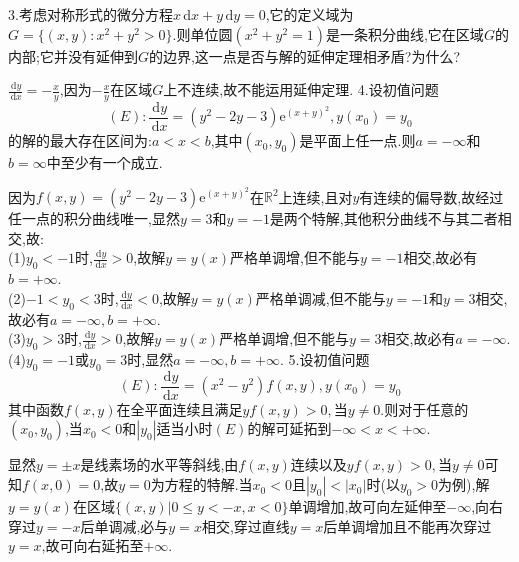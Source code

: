 \documentclass[titlepage,11pt,a4paper,twoside]{report}
\makeatletter
\newcommand\diff{\,\mathrm{d}}
\newcommand\e{\mathrm{e}}
\renewenvironment{proof}{\par
	\pushQED{\qed}%
	\normalfont \topsep1\p@\@plus6\p@\relax
	\trivlist
	\item\relax
	{\hspace*{\parindent}{\heiti 证明}\@addpunct{:}}\hspace\labelsep\ignorespaces
}{%
	\popQED\endtrivlist\@endpefalse
}
\newenvironment{solve}{\par
	\pushQED{\qed}%
	\normalfont \topsep1\p@\@plus6\p@\relax
	\trivlist
	\item\relax
	{\hspace*{\parindent}{\heiti 解}\@addpunct{:}}\hspace\labelsep\ignorespaces
}{%
	\popQED\endtrivlist\@endpefalse
}
\makeatother
\begin{document}
3.考虑对称形式的微分方程$x\diff x+y\diff y=0$,它的定义域为$G=\{(x,y):x^2+y^2>0\}$.则单位圆$(x^2+y^2=1)$是一条积分曲线,它在区域$G$的内部;它并没有延伸到$G$的边界,这一点是否与解的延伸定理相矛盾?为什么?
\begin{solve}
$\frac{\diff y}{\diff x}=-\frac{x}{y}$,因为$-\frac{x}{y}$在区域$G$上不连续,故不能运用延伸定理.
\end{solve}
4.设初值问题
\[(E):\frac{\diff y}{\diff x}=(y^2-2y-3)\e^{(x+y)^2},y(x_0)=y_0\]
的解的最大存在区间为:$a<x<b$,其中$(x_0,y_0)$是平面上任一点.则$a=-\infty$和$b=\infty$中至少有一个成立.
\begin{proof}
因为$f(x,y)=(y^2-2y-3)\e^{(x+y)^2}$在$\mathbb{R}^2$上连续,且对$y$有连续的偏导数,故经过任一点的积分曲线唯一,显然$y=3$和$y=-1$是两个特解,其他积分曲线不与其二者相交,故:\\
(1)$y_0<-1$时,$\frac{\diff y}{\diff x}>0$,故解$y=y(x)$严格单调增,但不能与$y=-1$相交,故必有$b=+\infty$.\\
(2)$-1<y_0<3$时,$\frac{\diff y}{\diff x}<0$,故解$y=y(x)$严格单调减,但不能与$y=-1$和$y=3$相交,故必有$a=-\infty,b=+\infty$.\\
(3)$y_0>3$时,$\frac{\diff y}{\diff x}>0$,故解$y=y(x)$严格单调增,但不能与$y=3$相交,故必有$a=-\infty$.\\
(4)$y_0=-1$或$y_0=3$时,显然$a=-\infty,b=+\infty$.
\end{proof}
5.设初值问题
\[(E):\frac{\diff y}{\diff x}=(x^2-y^2)f(x,y),y(x_0)=y_0\]
其中函数$f(x,y)$在全平面连续且满足$yf(x,y)>0,\mbox{当}y\neq0$.则对于任意的$(x_0,y_0)$,当$x_0<0$和$|y_0|$适当小时$(E)$的解可延拓到$-\infty<x<+\infty$.
\begin{proof}
显然$y=\pm x$是线素场的水平等斜线,由$f(x,y)$连续以及$yf(x,y)>0,\mbox{当}y\neq0$可知$f(x,0)=0$,故$y=0$为方程的特解.当$x_0<0$且$|y_0|<|x_0|$时(以$y_0>0$为例),解$y=y(x)$在区域$\{(x,y)|0\leq y<-x,x<0\}$单调增加,故可向左延伸至$-\infty$,向右穿过$y=-x$后单调减,必与$y=x$相交,穿过直线$y=x$后单调增加且不能再次穿过$y=x$,故可向右延拓至$+\infty$.
\end{proof}
\end{document}
